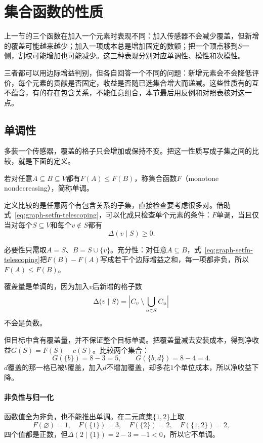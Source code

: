 
\section{集合函数的性质}
\label{sec:graph-set-function-properties}

上一节的三个函数在加入一个元素时表现不同：加入传感器不会减少覆盖，但新增的覆盖可能越来越少；加入一项成本总是增加固定的数额；把一个顶点移到$S$一侧，割权可能增加也可能减少。这三种表现分别对应单调性、模性和次模性。

三者都可以用边际增益判别，但各自回答一个不同的问题：新增元素会不会降低评价，每个元素的贡献是否固定，收益是否随已选集合增大而递减。这些性质有的互不蕴含，有的存在包含关系，不能任意组合，本节最后用反例和对照表核对这一点。

\subsection{单调性}
\label{sec:graph-setfn-monotonicity}

多装一个传感器，覆盖的格子只会增加或保持不变。把这一性质写成子集之间的比较，就是下面的定义。

\begin{definition}[单调非减]
\label{def:graph-setfn-monotone}
若对任意$A\subseteq B\subseteq V$都有$F(A)\leq F(B)$，称集合函数$F$（monotone nondecreasing），简称单调。
\end{definition}

定义比较的是任意两个有包含关系的子集，直接检查要考虑很多对。借助式~\eqref{eq:graph-setfn-telescoping}，可以化成只检查单个元素的条件：$F$单调，当且仅当对每个$S\subseteq V$和每个$v\notin S$都有
\[
  \Delta(v\mid S)\geq0.
\]

必要性只需取$A=S$、$B=S\cup\{v\}$。充分性：对任意$A\subseteq B$，式~\eqref{eq:graph-setfn-telescoping}把$F(B)-F(A)$写成若干个边际增益之和，每一项都非负，所以$F(A)\leq F(B)$。

覆盖量是单调的，因为加入$v$后新增的格子数
\[
  \Delta(v\mid S)=\Bigl|C_v\setminus\bigcup_{u\in S}C_u\Bigr|
\]
不会是负数。

但目标中含有覆盖量，并不保证整个目标单调。把覆盖量减去安装成本，得到净收益$G(S)=F(S)-c(S)$。比较两个集合：
\[
  G(\{b\})=8-3=5,\qquad G(\{b,d\})=8-4=4.
\]
$d$覆盖的那一格已被$b$覆盖，加入$d$不增加覆盖，却多花$1$个单位成本，所以净收益下降。

\paragraph{非负性与归一化}
函数值全为非负，也不能推出单调。在二元底集$\{1,2\}$上取
\[
  F(\varnothing)=1,\quad F(\{1\})=3,\quad F(\{2\})=2,\quad F(\{1,2\})=2,
\]
四个值都是正数，但$\Delta(2\mid\{1\})=2-3=-1<0$，所以它不单调。

